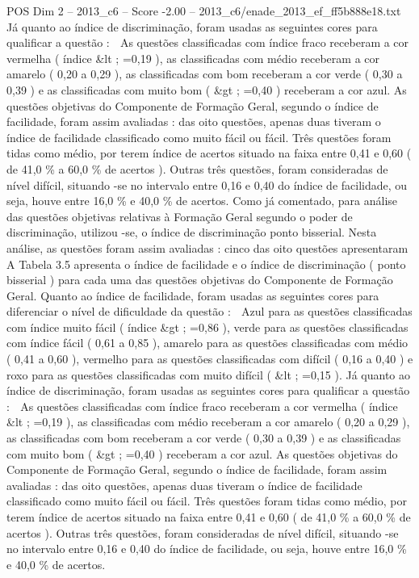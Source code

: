 \begin{textsample}{POS Dim 2 – 2013\_c6 – Score -2.00 – 2013\_c6/enade\_2013\_ef\_ff5b888e18.txt}
Já quanto ao índice de discriminação, foram usadas as seguintes cores para qualificar a questão :  As questões classificadas com índice fraco receberam a cor vermelha ( índice \&lt ; =0,19 ), as classificadas com médio receberam a cor amarelo ( 0,20 a 0,29 ), as classificadas com bom receberam a cor verde ( 0,30 a 0,39 ) e as classificadas com muito bom ( \&gt ; =0,40 ) receberam a cor azul.
As questões objetivas do Componente de Formação Geral, segundo o índice de facilidade, foram assim avaliadas : das oito questões, apenas duas tiveram o índice de facilidade classificado como muito fácil ou fácil.
Três questões foram tidas como médio, por terem índice de acertos situado na faixa entre 0,41 e 0,60 ( de 41,0 \% a 60,0 \% de acertos ).
Outras três questões, foram consideradas de nível difícil, situando -se no intervalo entre 0,16 e 0,40 do índice de facilidade, ou seja, houve entre 16,0 \% e 40,0 \% de acertos.
Como já comentado, para análise das questões objetivas relativas à Formação Geral segundo o poder de discriminação, utilizou -se, o índice de discriminação ponto bisserial.
Nesta análise, as questões foram assim avaliadas : cinco das oito questões apresentaram A Tabela 3.5 apresenta o índice de facilidade e o índice de discriminação ( ponto bisserial ) para cada uma das questões objetivas do Componente de Formação Geral.
Quanto ao índice de facilidade, foram usadas as seguintes cores para diferenciar o nível de dificuldade da questão :  Azul para as questões classificadas com índice muito fácil ( índice \&gt ; =0,86 ), verde para as questões classificadas com índice fácil ( 0,61 a 0,85 ), amarelo para as questões classificadas com médio ( 0,41 a 0,60 ), vermelho para as questões classificadas com difícil ( 0,16 a 0,40 ) e roxo para as questões classificadas com muito difícil ( \&lt ; =0,15 ).
Já quanto ao índice de discriminação, foram usadas as seguintes cores para qualificar a questão :  As questões classificadas com índice fraco receberam a cor vermelha ( índice \&lt ; =0,19 ), as classificadas com médio receberam a cor amarelo ( 0,20 a 0,29 ), as classificadas com bom receberam a cor verde ( 0,30 a 0,39 ) e as classificadas com muito bom ( \&gt ; =0,40 ) receberam a cor azul.
As questões objetivas do Componente de Formação Geral, segundo o índice de facilidade, foram assim avaliadas : das oito questões, apenas duas tiveram o índice de facilidade classificado como muito fácil ou fácil.
Três questões foram tidas como médio, por terem índice de acertos situado na faixa entre 0,41 e 0,60 ( de 41,0 \% a 60,0 \% de acertos ).
Outras três questões, foram consideradas de nível difícil, situando -se no intervalo entre 0,16 e 0,40 do índice de facilidade, ou seja, houve entre 16,0 \% e 40,0 \% de acertos.

\end{textsample}
